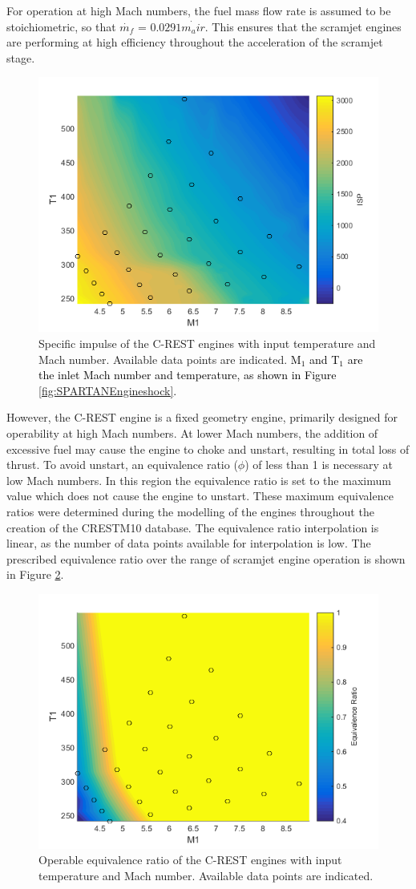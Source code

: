 For operation at high Mach numbers, the fuel mass flow rate is assumed to be stoichiometric, so that $\dot{m_f}$ = $0.0291\dot{m_air}$. This ensures that the scramjet engines are performing at high efficiency throughout the acceleration of the scramjet stage. 
\begin{figure}[ht]
	\centering
	\includegraphics[width=0.6\linewidth]{figures/3_vehicle_design/ISPinterp}
	\caption{Specific impulse of the C-REST engines with input temperature and Mach number. Available data points are indicated. \textcolor{black}{M$_1$ and T$_1$ are the inlet Mach number and temperature, as shown in Figure \ref{fig:SPARTANEngineshock}.}}
	\label{fig:ISPinterp}
\end{figure}
However, the C-REST engine is a fixed geometry engine, primarily designed for operability at high Mach numbers\cite{Preller2017b}. At lower Mach numbers, the addition of excessive fuel may cause the engine to choke and unstart, resulting in total loss of thrust\cite{Preller2017b}. To avoid unstart, an equivalence ratio ($\phi$) of less than 1 is necessary at low Mach numbers. In this region the equivalence ratio is set to the maximum value which does not cause the engine to unstart. These maximum equivalence ratios were determined during the modelling of the engines throughout the creation of the \textsf{CRESTM10} database. The equivalence ratio interpolation is linear, as the number of data points available for interpolation is low. The prescribed equivalence ratio over the range of scramjet engine operation is shown in Figure \ref{fig:EquivalenceRatioInterp}.
\begin{figure}[ht]
	\centering
	\includegraphics[width=0.6\linewidth]{figures/3_vehicle_design/EquivalenceRatioInterp}
	\caption{Operable equivalence ratio of the C-REST engines with input temperature and Mach number. Available data points are indicated.}
	\label{fig:EquivalenceRatioInterp}
\end{figure}

